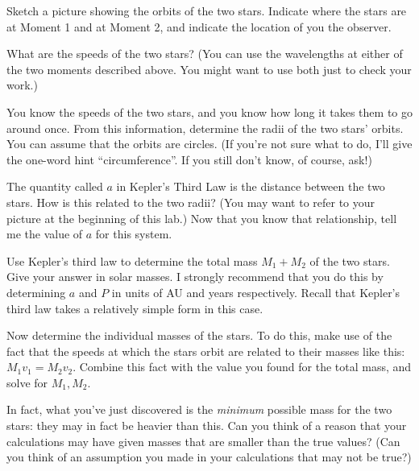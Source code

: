 Sketch a picture showing the orbits of the two stars. Indicate
where the stars are at Moment 1 and at Moment 2, and indicate the location
of you the observer.

\answerspace{2in}


What are the speeds of the two stars? (You can use the wavelengths
at either of the two moments described above. You might want to use
both just to check your work.)

\answerspace{2in}

\pagebreak[2]

You know the speeds of the two stars, and you know how long it takes
them to go around once. From this information, determine the radii
of the two stars' orbits. You can assume that the orbits are circles.
(If you're not sure what to do, I'll give the one-word hint
``circumference''. If you still don't know, of course, ask!)

\answerspace{2in}

The quantity called $a$ in Kepler's Third Law is the distance between
the two stars. How is this related to the two radii? (You may
want to refer to your picture at the beginning of this lab.) Now that you know
that relationship, tell me the value of $a$ for this system.

\answerspace{2in}

Use Kepler's third law to determine the total mass $M_1+M_2$ of the
two stars. Give your answer in solar masses. I strongly recommend
that you do this by determining $a$ and $P$ in units of AU and years
respectively. Recall that Kepler's third law takes a relatively simple
form in this case.

\answerspace{2in}

\pagebreak[2]

Now determine the individual masses of the stars. To do this, make
use of the fact that the speeds at which the stars orbit
are related to their masses like this: $M_1v_1=M_2v_2$. Combine
this fact with the value you found for the total mass, and solve for
$M_1,M_2$.

\answerspace{2in}

In fact, what you've just discovered is the \textit{minimum} possible
mass for the two stars: they may in fact be heavier than this.
Can you think of a reason that your calculations may have given
masses that are smaller than the true values? (Can you think of an
assumption you made in your calculations that may not be true?)

\answerspace{1in}

